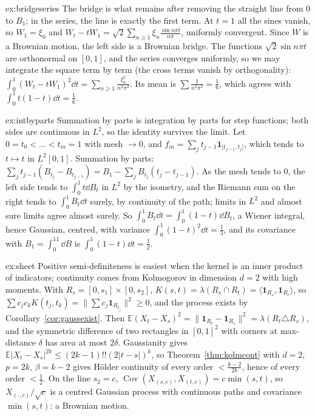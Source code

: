 \begin{solution}{ex:bridgeseries}
\idea The bridge is what remains after removing the straight line from $0$ to $B_1$; in the series, the line is exactly the first term.
\writeup At $t=1$ all the sines vanish, so $W_1=\xi_0$ and $W_t-tW_1=\sqrt2\sum_{n\ge1}\xi_n\frac{\sin n\pi t}{n\pi}$, uniformly convergent. Since $W$ is a Brownian motion, the left side is a Brownian bridge. The functions
$\sqrt2\sin n\pi t$ are orthonormal on $[0,1]$, and the series converges uniformly, so we may integrate the square term by term (the cross terms vanish by orthogonality):
$\int_0^1(W_t-tW_1)^2\dd t=\sum_{n\ge1}\frac{\xi_n^2}{n^2\pi^2}$. Its mean is $\sum\frac1{n^2\pi^2}=\frac16$, which agrees with $\int_0^1t(1-t)\dd t=\frac16$.
\end{solution}

\begin{solution}{ex:intbyparts}
\idea Summation by parts is integration by parts for step functions; both sides are continuous in $L^2$, so the identity survives the limit.
\writeup Let $0=t_0<\dots<t_m=1$ with mesh $\to0$, and $f_m=\sum_jt_{j-1}\mathbf 1_{]t_{j-1},t_j]}$, which tends to $t\mapsto t$ in $L^2[0,1]$. Summation by parts:
$\sum_jt_{j-1}(B_{t_j}-B_{t_{j-1}})=B_1-\sum_jB_{t_j}(t_j-t_{j-1})$. As the mesh tends to $0$, the left side tends to $\int_0^1t\dd B_t$ in $L^2$ by the isometry, and the Riemann sum on the right tends to
$\int_0^1B_t\dd t$ surely, by continuity of the path; limits in $L^2$ and almost sure limits agree almost surely. So $\int_0^1B_t\dd t=\int_0^1(1-t)\dd B_t$, a Wiener integral, hence Gaussian, centred, with variance
$\int_0^1(1-t)^2\dd t=\frac13$, and its covariance with $B_1=\int_0^11\dd B$ is $\int_0^1(1-t)\dd t=\frac12$.
\end{solution}

\begin{solution}{ex:sheet}
\idea Positive semi-definiteness is easiest when the kernel is an inner product of indicators; continuity comes from Kolmogorov in dimension $d=2$ with high moments.
\writeup With $R_s=[0,s_1]\times[0,s_2]$, $K(s,t)=\lambda(R_s\cap R_t)=\langle\mathbf 1_{R_s},\mathbf 1_{R_t}\rangle$, so $\sum c_jc_kK(t_j,t_k)=\|\sum c_j\mathbf 1_{R_{t_j}}\|^2\ge0$, and the process exists by
Corollary~\ref{cor:gaussexist}. Then $\mathbb E(X_t-X_s)^2=\|\mathbf 1_{R_t}-\mathbf 1_{R_s}\|^2=\lambda(R_t\triangle R_s)$, and the symmetric difference of two rectangles in $[0,1]^2$ with corners at max-distance $\delta$ has
area at most $2\delta$. Gaussianity gives $\mathbb E|X_t-X_s|^{2k}\le(2k-1)!!(2|t-s|)^k$, so Theorem~\ref{thm:kolmcont} with $d=2$, $p=2k$, $\beta=k-2$ gives H\"older continuity of every order $<\frac{k-2}{2k}$, hence of
every order $<\frac12$. On the line $s_2=c$, $\operatorname{Cov}(X_{(s,c)},X_{(t,c)})=c\min(s,t)$, so $X_{(\cdot,c)}/\sqrt c$ is a centred Gaussian process with continuous paths and covariance $\min(s,t)$: a Brownian motion.
\end{solution}

